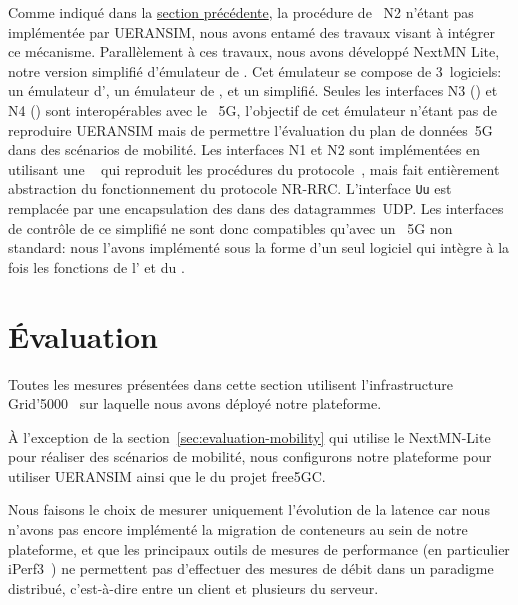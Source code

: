 \documentclass[../main.tex]{subfiles}
\begin{document}
Comme indiqué dans la \hyperref[sec:testbed-composants-existants]{section précédente}, la procédure de ~N2 n’étant pas implémentée par UERANSIM, nous avons entamé des travaux visant à intégrer ce mécanisme.
Parallèlement à ces travaux, nous avons développé NextMN Lite, notre version simplifié d’émulateur de .
Cet émulateur se compose de 3~logiciels: un émulateur d’, un émulateur de , et un  simplifié.
Seules les interfaces N3 () et N4 () sont interopérables avec le ~5G, l’objectif de cet émulateur n’étant pas de reproduire UERANSIM mais de permettre l’évaluation du plan de données~5G dans des scénarios de mobilité.
Les interfaces N1 et N2 sont implémentées en utilisant une ~ qui reproduit les procédures du protocole~, mais fait entièrement abstraction du fonctionnement du protocole NR-RRC.
L’interface \texttt{Uu} est remplacée par une encapsulation des  dans des datagrammes~UDP.
Les interfaces de contrôle de ce  simplifié ne sont donc compatibles qu’avec un ~5G non standard: nous l’avons implémenté sous la forme d’un seul logiciel qui intègre à la fois les fonctions de l’ et du .

\pagebreak
\enlargethispage*{2\baselineskip} %
\section{Évaluation}

Toutes les mesures présentées dans cette section utilisent l’infrastructure Grid’5000~\cite{Grid5000} sur laquelle nous avons déployé notre plateforme.

À l’exception de la section~\ref{sec:evaluation-mobility} qui utilise le NextMN-Lite pour réaliser des scénarios de mobilité, nous configurons notre plateforme pour utiliser UERANSIM ainsi que le  du projet free5GC.

Nous faisons le choix de mesurer uniquement l’évolution de la latence car nous n’avons pas encore implémenté la migration de conteneurs au sein de notre plateforme, et que les principaux outils de mesures de performance (en particulier iPerf3~\cite{iPerf3}) ne permettent pas d’effectuer des mesures de débit dans un paradigme distribué, c’est-à-dire entre un client et plusieurs  du serveur.
\end{document}
